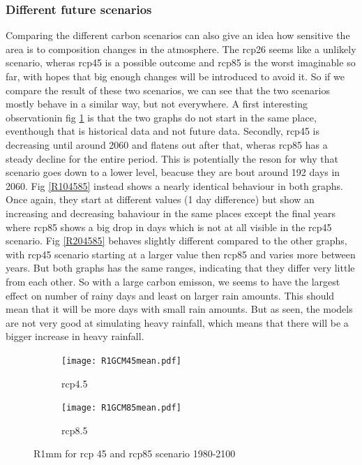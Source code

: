 \documentclass{article}
\begin{document}
\subsubsection{Different future scenarios}
Comparing the different carbon scenarios can also give an idea how sensitive the area is to composition changes in the atmosphere. The rcp26 seems like a unlikely scenario, wheras rcp45 is a possible outcome and rcp85 is the worst imaginable so far, with hopes that big enough changes will be introduced to avoid it. So if we compare the result of these two scenarios, we can see that the two scenarios mostly behave in a similar way, but not everywhere. A first interesting observationin fig \ref{R14585} is that the two graphs do not start in the same place, eventhough that is historical data and not future data. Secondly, rcp45 is decreasing until around 2060 and flatens out after that, wheras rcp85 has a steady decline for the entire period. This is potentially the reson for why that scenario goes down to a lower level, beacuse they are bout around 192 days in 2060. Fig \ref{R104585} instead shows a nearly identical behaviour in both graphs. Once again, they start at different values (1 day difference) but show an increasing and decreasing bahaviour in the same places except the final years where rcp85 shows a big drop in days which is not at all visible in the rcp45 scenario. Fig \ref{R204585} behaves slightly different compared to the other graphs, with rcp45 scenario starting at a larger value then rcp85 and varies more between years. But both graphs has the same ranges, indicating that they differ very little from each other. 
So with a large carbon emisson, we seems to have the largest effect on number of rainy days and least on larger rain amounts. This should mean that it will be more days with small rain amounts. But as seen, the models are not very good at simulating heavy rainfall, which means that there will be a bigger increase in heavy rainfall.
\begin{figure}[H]
	\centering
	\begin{subfigure}{0.5\textwidth}
		\centering
		\texttt{[image: R1GCM45mean.pdf]}
		\caption{rcp4.5}
	\end{subfigure}%
	\begin{subfigure}{0.5\textwidth}
		\centering
		\texttt{[image: R1GCM85mean.pdf]}
		\caption{rcp8.5}
	\end{subfigure}
	\caption{R1mm for rcp 45 and rcp85 scenario 1980-2100}
	\label{R14585}
\end{figure}
\end{document}
